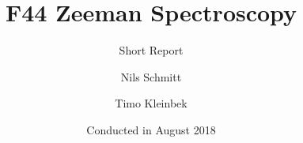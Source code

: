 \documentclass[12pt,
				 a4paper,
				numbers=endperiod
				 ]{scrartcl}
\title{F44 Zeeman Spectroscopy}
\subtitle{Short Report}
\author{Nils Schmitt \and Timo Kleinbek}
\date{Conducted in August 2018}
\begin{document}
\twocolumn
\maketitle





\printbibliography
\end{document}
